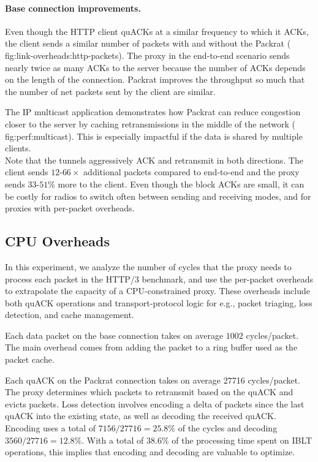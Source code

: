 \paragraph{Base connection improvements.}

Even though the HTTP client quACKs at a similar frequency to which it ACKs, the
client sends a similar number of packets with and without the Packrat (\Cref
{fig:link-overheads:http-packets}). The proxy in the end-to-end scenario sends
nearly twice as many ACKs to the server because the number of ACKs depends on
the length of the connection. Packrat improves the throughput so much that the
number of net packets sent by the client are similar.

The IP multicast application demonstrates how Packrat can reduce congestion closer
to the server by caching retransmissions in the middle of the network (\Cref
{fig:perf:multicast}). This is especially impactful if the data is shared by
multiple clients.\\

\noindent Note that the tunnels aggressively ACK and retransmit in both
directions. The client sends $12$-$66\!\times$ additional packets compared to
end-to-end and the proxy sends $33$-$51$\% more to the client. Even though the
block ACKs are small, it can be costly for radios to switch often between
sending and receiving modes, and for proxies with per-packet overheads.

\subsection{CPU Overheads}
\label{sec:packrat:evaluation:cpu-overheads}

In this experiment, we analyze the number of cycles that the proxy
needs to process each
packet in the HTTP/3 benchmark, and use the per-packet overheads to
extrapolate the capacity of a CPU-constrained proxy. These overheads
include both quACK operations and transport-protocol logic for e.g.,
packet triaging, loss detection, and cache management.

Each data packet on the base connection takes on average $1002$ cycles/packet.
The main overhead comes from adding the packet to a ring buffer used as the
packet cache.

Each quACK on the Packrat connection takes on average 27716 cycles/packet. The
proxy determines which packets to retransmit based on the quACK and evicts
packets. Loss detection involves encoding a delta of packets since the last
quACK into the existing state, as well as decoding the received quACK. Encoding
uses a total of $7156/27716 = 25.8\%$ of the cycles and decoding $3560/27716 =
12.8\%$. With a total of $38.6\%$ of the processing time spent on IBLT
operations, this implies that encoding and decoding are valuable to optimize.

